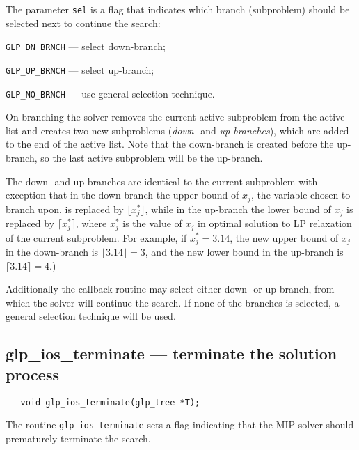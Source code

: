 The parameter \verb|sel| is a flag that indicates which branch
(subproblem) should be selected next to continue the search:

\verb|GLP_DN_BRNCH| --- select down-branch;

\verb|GLP_UP_BRNCH| --- select up-branch;

\verb|GLP_NO_BRNCH| --- use general selection technique.

\newpage


On branching the solver removes the current active subproblem from the
active list and creates two new subproblems ({\it down-} and {\it
up-branches}), which are added to the end of the active list. Note that
the down-branch is created before the up-branch, so the last active
subproblem will be the up-branch.

The down- and up-branches are identical to the current subproblem with
exception that in the down-branch the upper bound of $x_j$, the variable
chosen to branch upon, is replaced by $\lfloor x_j^*\rfloor$, while in
the up-branch the lower bound of $x_j$ is replaced by
$\lceil x_j^*\rceil$, where $x_j^*$ is the value of $x_j$ in optimal
solution to LP relaxation of the current subproblem. For example, if
$x_j^*=3.14$, the new upper bound of $x_j$ in the down-branch is
$\lfloor 3.14\rfloor=3$, and the new lower bound in the up-branch is
$\lceil 3.14\rceil=4$.)

Additionally the callback routine may select either down- or up-branch,
from which the solver will continue the search. If none of the branches
is selected, a general selection technique will be used.

\subsection{glp\_ios\_terminate --- terminate the solution process}

\synopsis

\begin{verbatim}
   void glp_ios_terminate(glp_tree *T);
\end{verbatim}

\description

The routine \verb|glp_ios_terminate| sets a flag indicating that the
MIP solver should prematurely terminate the search.


\newpage

